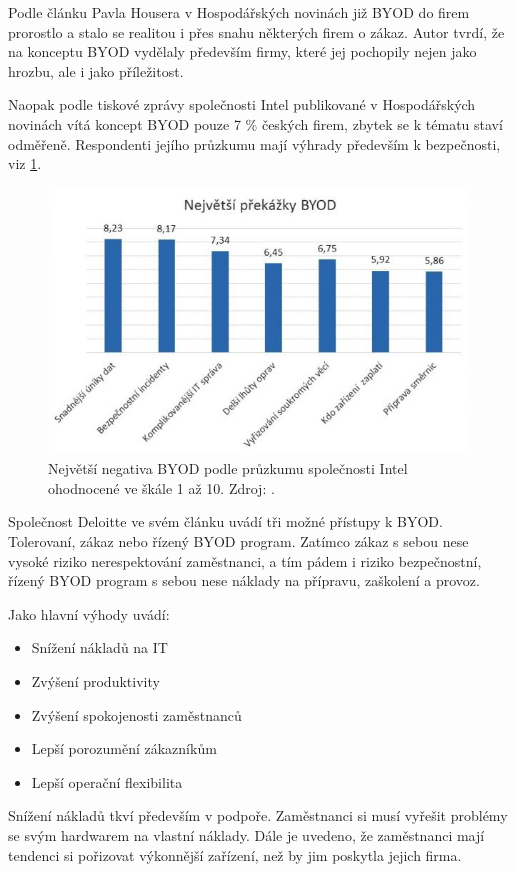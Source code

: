 Podle článku Pavla Housera v Hospodářských novinách \cite{HNBYOD}
již BYOD do firem prorostlo a stalo se realitou i přes snahu některých firem o zákaz. Autor tvrdí, že na konceptu BYOD vydělaly především firmy, které jej pochopily nejen jako hrozbu, ale i jako příležitost. 

Naopak podle tiskové zprávy společnosti Intel publikované v Hospodářských novinách \cite{IntelBYOD} vítá koncept BYOD pouze 7 \% českých firem, zbytek se k tématu staví odměřeně. Respondenti jejího průzkumu mají výhrady především k bezpečnosti, viz \ref{intelBYOD}.

\begin{figure}[h!]\label{intelBYOD}
\centering
\includegraphics[width=12cm]{img/intelBYOD}
\caption{Největší negativa BYOD podle průzkumu společnosti Intel ohodnocené ve škále 1 až 10. Zdroj: \cite{IntelBYOD}.} 
\end{figure}

Společnost Deloitte ve svém článku  \cite{DeloitteBYOD} uvádí tři možné přístupy k BYOD. Tolerovaní, zákaz nebo řízený BYOD program. Zatímco zákaz s sebou nese vysoké riziko nerespektování zaměstnanci, a tím pádem i riziko bezpečnostní, řízený BYOD program s sebou nese náklady na přípravu, zaškolení a provoz.

Jako hlavní výhody uvádí:
\begin{itemize}
\item Snížení nákladů na IT
\item Zvýšení produktivity
\item Zvýšení spokojenosti zaměstnanců
\item Lepší porozumění zákazníkům
\item Lepší operační flexibilita
\end{itemize}

Snížení nákladů tkví především v podpoře. Zaměstnanci si musí vyřešit problémy se svým hardwarem na vlastní náklady. Dále je uvedeno, že zaměstnanci mají tendenci si pořizovat výkonnější zařízení, než by jim poskytla jejich firma. 

